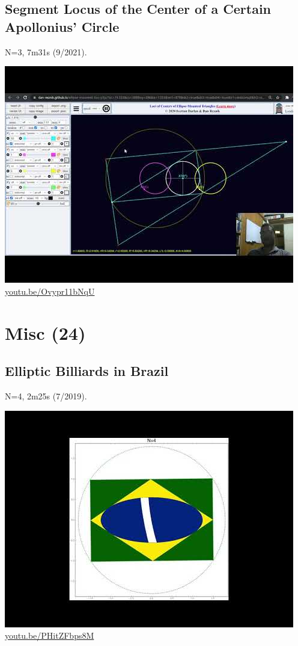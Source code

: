 \documentclass[12pt]{amsart}
\begin{document}
\subsection{Segment Locus of the Center of a Certain Apollonius' Circle}
\label{vid:Ovypr11bNqU}
\noindent N=3, 7m31s (9/2021). 
\begin{center}\includegraphics[width=.5\textwidth]{pics/Ovypr11bNqU.jpg} \\ 
\href{https://youtu.be/Ovypr11bNqU}{\url{youtu.be/Ovypr11bNqU}}\end{center}
% 


\section{Misc (24)}

\subsection{Elliptic Billiards in Brazil}
\label{vid:PHitZFbps8M}
\noindent N=4, 2m25s (7/2019). 
\begin{center}\includegraphics[width=.5\textwidth]{pics/PHitZFbps8M.jpg} \\ 
\href{https://youtu.be/PHitZFbps8M}{\url{youtu.be/PHitZFbps8M}}\end{center}
% 
\end{document}
